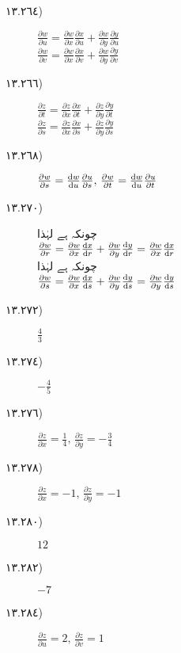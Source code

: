 \begin {description}
\item [
\protect ١٣.\protect ٢٦٤)
]
 $\tfrac {\partial w}{\partial u}=\tfrac {\partial w}{\partial x}\tfrac {\partial x}{\partial u}+\tfrac {\partial w}{\partial y}\tfrac {\partial y}{\partial u}$\\ $\tfrac {\partial w}{\partial v}=\tfrac {\partial w}{\partial x}\tfrac {\partial x}{\partial v}+\tfrac {\partial w}{\partial y}\tfrac {\partial y}{\partial v}$ 
\item [
\protect ١٣.\protect ٢٦٦)
]
 $\tfrac {\partial z}{\partial t}=\tfrac {\partial z}{\partial x}\tfrac {\partial x}{\partial t}+\tfrac {\partial z}{\partial y}\tfrac {\partial y}{\partial t}$\\ $\tfrac {\partial z}{\partial s}=\tfrac {\partial z}{\partial x}\tfrac {\partial x}{\partial s}+\tfrac {\partial z}{\partial y}\tfrac {\partial y}{\partial s}$ 
\item [
\protect ١٣.\protect ٢٦٨)
]
 $\tfrac {\partial w}{\partial s}=\tfrac {\dif w}{\dif u}\tfrac {\partial u}{\partial s},\,\tfrac {\partial w}{\partial t}=\tfrac {\dif w}{\dif u}\tfrac {\partial u}{\partial t}$ 
\item [
\protect ١٣.\protect ٢٧٠)
]
 چونکہ  ہے لہٰذا \\ $\tfrac {\partial w}{\partial r}=\tfrac {\partial w}{\partial x}\tfrac {\dif x}{\dif r}+\tfrac {\partial w}{\partial y}\tfrac {\dif y}{\dif r}=\tfrac {\partial w}{\partial x}\tfrac {\dif x}{\dif r}$\\ چونکہ  ہے لہٰذا \\ $\tfrac {\partial w}{\partial s}=\tfrac {\partial w}{\partial x}\tfrac {\dif x}{\dif s}+\tfrac {\partial w}{\partial y}\tfrac {\dif y}{\dif s}=\tfrac {\partial w}{\partial y}\tfrac {\dif y}{\dif s}$ 
\item [
\protect ١٣.\protect ٢٧٢)
]
 $\tfrac {4}{3}$ 
\item [
\protect ١٣.\protect ٢٧٤)
]
 $-\tfrac {4}{5}$ 
\item [
\protect ١٣.\protect ٢٧٦)
]
 $\tfrac {\partial z}{\partial x}=\tfrac {1}{4},\,\tfrac {\partial z}{\partial y}=-\tfrac {3}{4}$ 
\item [
\protect ١٣.\protect ٢٧٨)
]
 $\tfrac {\partial z}{\partial x}=-1,\,\tfrac {\partial z}{\partial y}=-1$ 
\item [
\protect ١٣.\protect ٢٨٠)
]
 $12$ 
\item [
\protect ١٣.\protect ٢٨٢)
]
 $-7$ 
\item [
\protect ١٣.\protect ٢٨٤)
]
 $\tfrac {\partial z}{\partial u}=2,\,\tfrac {\partial z}{\partial v}=1$ 

\end{description}
